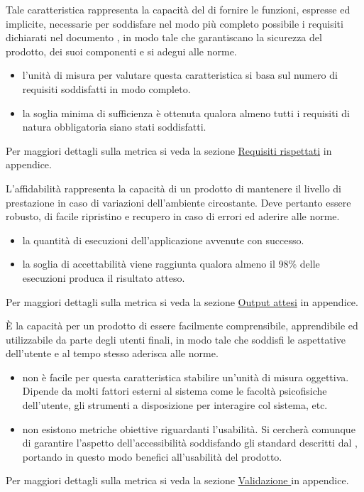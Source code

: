\documentclass[a4paper, titlepage]{article}
\begin{document}
Tale caratteristica rappresenta la capacità del  di fornire le funzioni, espresse ed implicite, necessarie per soddisfare nel modo più completo possibile i requisiti dichiarati nel documento \ARdoc, in modo tale che garantiscano la sicurezza del prodotto, dei suoi componenti e si adegui alle norme.
\begin{itemize}
\item {} l'unità di misura per valutare questa caratteristica si basa sul numero di requisiti soddisfatti in modo completo.
\item {} la soglia minima di sufficienza è ottenuta qualora almeno tutti i requisiti di natura obbligatoria siano stati soddisfatti.
\end{itemize}
Per maggiori dettagli sulla metrica si veda la sezione \hyperref[par:req]{Requisiti rispettati} in appendice.

\newpage
{}
L'affidabilità rappresenta la capacità di un prodotto  di mantenere il livello di prestazione in caso di variazioni dell'ambiente circostante. Deve pertanto essere robusto, di facile ripristino e recupero in caso di errori ed aderire alle norme.
\begin{itemize}
\item {} la quantità di esecuzioni dell'applicazione avvenute con successo.
\item {} la soglia di accettabilità viene raggiunta qualora almeno il 98\% delle esecuzioni produca il risultato atteso.
\end{itemize}
Per maggiori dettagli sulla metrica si veda la sezione \hyperref[par:out]{Output attesi} in appendice.

È la capacità per un prodotto di essere facilmente comprensibile, apprendibile ed utilizzabile da parte degli utenti finali, in modo tale che soddisfi le aspettative dell'utente e al tempo stesso aderisca alle norme. 
\begin{itemize}
\item {} non è facile per questa caratteristica stabilire un'unità di misura oggettiva. Dipende da molti fattori esterni al sistema come le facoltà psicofisiche dell'utente, gli strumenti a disposizione per interagire col sistema, etc.
\item {} non esistono metriche obiettive riguardanti l’usabilità. Si cercherà comunque di garantire l'aspetto dell'accessibilità soddisfando gli standard  descritti dal , portando in questo modo benefici all'usabilità del prodotto.
\end{itemize}
Per maggiori dettagli sulla metrica si veda la sezione \hyperref[par:\gl{web}]{Validazione } in appendice.
\end{document}
